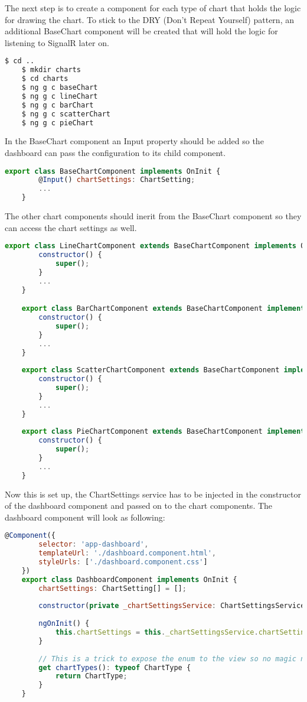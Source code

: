 The next step is to create a component for each type of chart that holds the logic for drawing the chart. To stick to the DRY (Don't Repeat Yourself) pattern, an additional BaseChart component will be created that will hold the logic for listening to SignalR later on.

\begin{lstlisting}[language=bash]
	$ cd ..
	$ mkdir charts
	$ cd charts
	$ ng g c baseChart
	$ ng g c lineChart
	$ ng g c barChart
	$ ng g c scatterChart
	$ ng g c pieChart
\end{lstlisting}

In the BaseChart component an Input property should be added so the dashboard can pass the configuration to its child component.

\begin{lstlisting}[language=JavaScript]
	export class BaseChartComponent implements OnInit {
		@Input() chartSettings: ChartSetting;
		...
	}
\end{lstlisting}

The other chart components should inerit from the BaseChart component so they can access the chart settings as well.

\begin{lstlisting}[language=JavaScript]
	export class LineChartComponent extends BaseChartComponent implements OnInit {
		constructor() {
			super();
		}
		...
	}

	export class BarChartComponent extends BaseChartComponent implements OnInit {
		constructor() {
			super();
		}
		...
	}
	
	export class ScatterChartComponent extends BaseChartComponent implements OnInit {
		constructor() {
			super();
		}
		...
	}
	
	export class PieChartComponent extends BaseChartComponent implements OnInit {
		constructor() {
			super();
		}
		...
	}
\end{lstlisting}

Now this is set up, the ChartSettings service has to be injected in the constructor of the dashboard component and passed on to the chart components. The dashboard component will look as following:
 
\begin{lstlisting}[language=JavaScript] 	
 	@Component({
 		selector: 'app-dashboard',
 		templateUrl: './dashboard.component.html',
 		styleUrls: ['./dashboard.component.css']
 	})
 	export class DashboardComponent implements OnInit {
 		chartSettings: ChartSetting[] = [];
 		
 		constructor(private _chartSettingsService: ChartSettingsService) { }
 		
 		ngOnInit() {
 			this.chartSettings = this._chartSettingsService.chartSettings;
 		}
 	
	 	// This is a trick to expose the enum to the view so no magic numbers are needed
	 	get chartTypes(): typeof ChartType {
	 		return ChartType;
	 	}	
 	}
\end{lstlisting}


